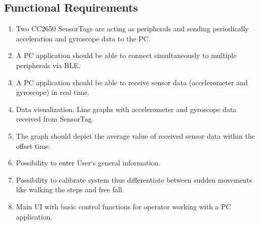 \documentclass[conference,12pt]{IEEETran}
\begin{document}
\subsection{Functional Requirements}
\begin{enumerate}
		\item Two CC2650 SensorTags are acting as peripherals and sending periodically acceleration and gyroscope data to the PC.
		\item A PC application should be able to connect simultaneously to multiple peripherals via BLE.
		\item A PC application should be able to receive sensor data (accelerometer and gyroscope) in real time.
		\item Data visualization. Line graphs with accelerometer and gyroscope data received from SensorTag.
		\item The graph should depict the average value of received sensor data within the offset time.
		\item Possibility to enter User‘s general information.
		\item Possibility to calibrate system thus differentiate between sudden movements like walking the steps and free fall.
		\item Main UI with basic control functions for operator working with a PC application.		
	\end{enumerate}
\end{document}
